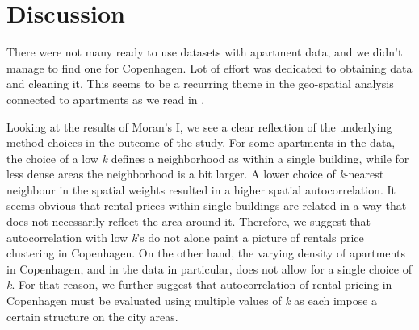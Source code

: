 \documentclass{article}
\begin{document}

\section{Discussion}
There were not many ready to use datasets with apartment data, and we didn't manage to find one for Copenhagen. Lot of effort was dedicated to obtaining data and cleaning it. This seems to be a recurring theme in the geo-spatial analysis connected to apartments as we read in \cite{monit}. 

Looking at the results of Moran's I, we see a clear reflection of the underlying method choices in the outcome of the study. For some apartments in the data, the choice of a low \textit{k} defines a neighborhood as within a single building, while for less dense areas the neighborhood is a bit larger. A lower choice of \textit{k}-nearest neighbour in the spatial weights resulted in a higher spatial autocorrelation. It seems obvious that rental prices within single buildings are related in a way that does not necessarily reflect the area around it. Therefore, we suggest that autocorrelation with low \textit{k}'s do not alone paint a picture of rentals price clustering in Copenhagen. On the other hand, the varying density of apartments in Copenhagen, and in the data in particular, does not allow for a single choice of \textit{k}. For that reason, we further suggest that autocorrelation of rental pricing in Copenhagen must be evaluated using multiple values of \textit{k} as each impose a certain structure on the city areas.
\end{document}
